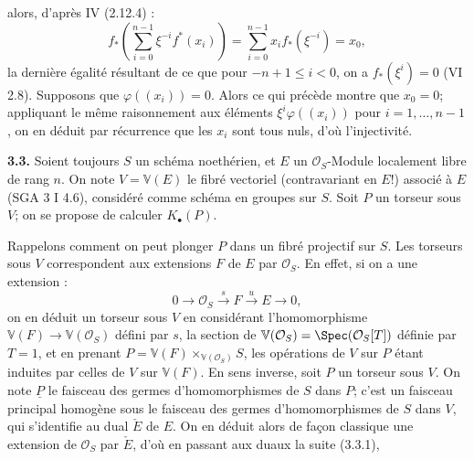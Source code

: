 alors, d'après IV (2.12.4) :
\[
f_*\left(\sum_{i=0}^{n-1}\xi^{-i}f^*(x_i)\right)
=\sum_{i=0}^{n-1}x_i f_*(\xi^{-i})=x_0,
\]
la dernière égalité résultant de ce que pour $-n+1\le i<0$, on a $f_*(\xi^i)=0$ (VI 2.8). Supposons que $\varphi((x_i))=0$. Alors ce qui précède montre que $x_0=0$; appliquant le même raisonnement aux éléments $\xi^i\varphi((x_i))$ pour $i=1,\ldots,n-1$, on en déduit par récurrence que les $x_i$ sont tous nuls, d'où l'injectivité.

\textbf{3.3.} Soient toujours $S$ un schéma noethérien, et $E$ un $\mathcal O_S$-Module localement libre de rang $n$. On note $V=\mathbb V(E)$ le fibré vectoriel (contravariant en $E$!) associé à $E$ (SGA 3 I 4.6), considéré comme schéma en groupes sur $S$. Soit $P$ un torseur sous $V$; on se propose de calculer $K_\bullet(P)$.

Rappelons comment on peut plonger $P$ dans un fibré projectif sur $S$. Les torseurs sous $V$ correspondent aux extensions $F$ de $E$ par $\mathcal O_S$. En effet, si on a une extension :
\[
0\longrightarrow \mathcal O_S\xrightarrow{s}F\xrightarrow{u}E\longrightarrow 0,
\tag{3.3.1}
\]
on en déduit un torseur sous $V$ en considérant l'homomorphisme $\mathbb V(F)\to \mathbb V(\mathcal O_S)$ défini par $s$, la section de $\mathbb V(\mathcal O_S)=\Spec(\mathcal O_S[T])$ définie par $T=1$, et en prenant $P=\mathbb V(F)\times_{\mathbb V(\mathcal O_S)}S$, les opérations de $V$ sur $P$ étant induites par celles de $V$ sur $\mathbb V(F)$.
En sens inverse, soit $P$ un torseur sous $V$. On note $\underline P$ le faisceau des germes d'homomorphismes de $S$ dans $P$; c'est un faisceau principal homogène sous le faisceau des germes d'homomorphismes de $S$ dans $V$, qui s'identifie au dual $\check E$ de $E$. On en déduit alors de façon classique une extension de $\mathcal O_S$ par $\check E$, d'où en passant aux duaux la suite (3.3.1),

